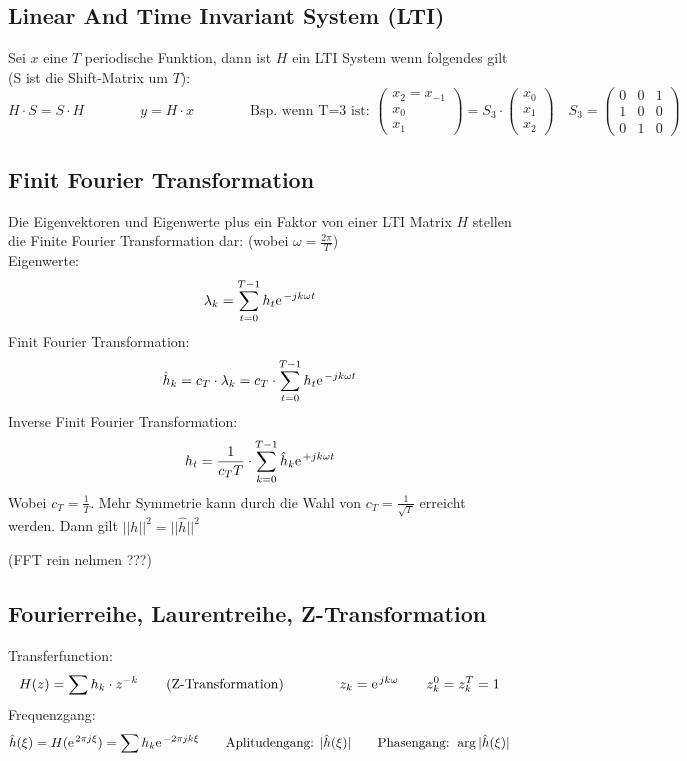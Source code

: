 \subsection{Linear And Time Invariant System (LTI)}
Sei $x$ eine $T$ periodische Funktion, dann ist $H$ ein LTI System wenn folgendes gilt (S ist die Shift-Matrix um $T$):
\[ 	H\cdot S = S\cdot H \qquad \qquad y=H\cdot x 
	\qquad \qquad 
	\text{Bsp. wenn T=3 ist: } \left( \begin{array}{ccc} x_2=x_{-1} \\ x_0 \\ x_1 \end{array} \right) = S_3 \cdot \left( \begin{array}{ccc} x_0 \\ x_1 \\ x_2 \end{array} \right) \quad
	S_3=
	\left( \begin{array}{ccc}
	0 & 0 & 1 \\
	1 & 0 & 0 \\
	0 & 1 & 0 
	\end{array} \right) 
\]


\subsection{Finit Fourier Transformation}
Die Eigenvektoren und Eigenwerte plus ein Faktor von einer LTI Matrix $H$ stellen die Finite Fourier Transformation dar: (wobei $\omega = \frac{2\pi}{T}$)\\

Eigenwerte: \[ \lambda_k = \sum_{t=0}^{T-1} h_t \e^{-jk\omega t} \]
Finit Fourier Transformation: \[ \hat{h}_k = c_T \cdot \lambda_k = c_T \cdot \sum_{t=0}^{T-1} h_t \e^{-jk\omega t} \]
Inverse Finit Fourier Transformation: \[ h_t = \frac{1}{c_T T} \cdot \sum_{k=0}^{T-1}\hat{h}_k \e^{+jk\omega t} \]
Wobei $c_T = \frac{1}{T}$. Mehr Symmetrie kann durch die Wahl von $c_T = \frac{1}{\sqrt{T}}$ erreicht werden. Dann gilt $||h||^2=||\hat{h}||^2$

(FFT rein nehmen ???)

\subsection{Fourierreihe, Laurentreihe, Z-Transformation}

Transferfunction: \[ H(z)=\sum h_k \cdot z^{-k} \qquad \text{(Z-Transformation)} \qquad \qquad z_k=\e^{jk\omega} \qquad z_k^0=z_k^T=1 \]
Frequenzgang: \[ \hat{h}(\xi) = H(\e^{2\pi j \xi})=\sum h_k \e^{-2\pi jk \xi} \qquad \text{Aplitudengang: } |\hat{h}(\xi)| \qquad \text{Phasengang: } \arg|\hat{h}(\xi)| \]

